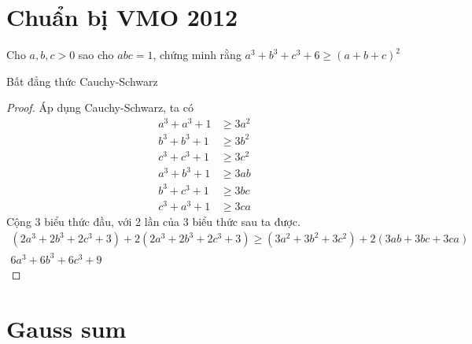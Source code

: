 \documentclass{treatise}
\begin{document}
\section{Chuẩn bị VMO 2012}
\begin{exercise}
Cho $a, b, c > 0$ sao cho $abc = 1$, chứng minh rằng $a^3 + b^3 + c^3 + 6 \geq (a + b + c)^2$
\end{exercise}
\begin{remark}
Bất đẳng thức Cauchy-Schwarz
\end{remark}
\begin{proof}
Áp dụng Cauchy-Schwarz, ta có
\begin{align*}
a^3 + a^3 + 1 & \geq 3a^2 \\
b^3 + b^3 + 1 & \geq 3b^2 \\
c^3 + c^3 + 1 & \geq 3c^2 \\
a^3 + b^3 + 1 & \geq 3ab \\
b^3 + c^3 + 1 & \geq 3bc \\
c^3 + a^3 + 1 & \geq 3ca
\end{align*}
Cộng 3 biểu thức đầu, với 2 lần của 3 biểu thức sau ta được.
\begin{align*}
(2a^3 + 2b^3 + 2c^3 + 3) + 2 (2a^3 + 2b^3 + 2c^3 + 3) \geq (3a^2 + 3b^2 + 3c^2)+ 2(3ab + 3bc + 3ca) \\
6a^3 + 6b^3 + 6c^3 + 9
\end{align*}
\end{proof}

\newpage

\section{Gauss sum}
\end{document}

